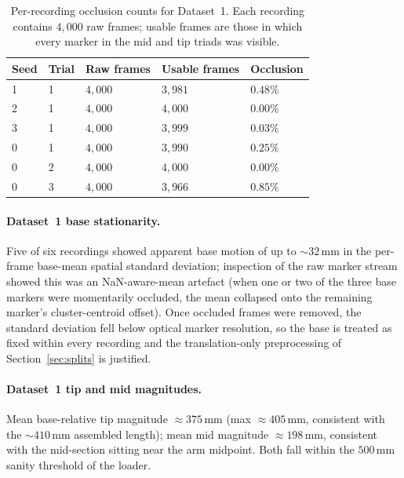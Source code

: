 \begin{table}[!htbp]
  \centering
  \small
  \caption[Per-recording occlusion counts for Dataset~1.]{Per-recording occlusion counts for Dataset~1. Each recording contains $4{,}000$ raw frames; usable frames are those in which every marker in the mid and tip triads was visible.}
  \label{tab:app_eda_ds1_occlusion}
  \begin{tabularx}{\linewidth}{@{}l l X X X@{}}
    \toprule
    Seed & Trial & Raw frames & Usable frames & Occlusion \\
    \midrule
    1 & 1 & $4{,}000$ & $3{,}981$ & $0.48\%$ \\
    2 & 1 & $4{,}000$ & $4{,}000$ & $0.00\%$ \\
    3 & 1 & $4{,}000$ & $3{,}999$ & $0.03\%$ \\
    0 & 1 & $4{,}000$ & $3{,}990$ & $0.25\%$ \\
    0 & 2 & $4{,}000$ & $4{,}000$ & $0.00\%$ \\
    0 & 3 & $4{,}000$ & $3{,}966$ & $0.85\%$ \\
    \bottomrule
  \end{tabularx}
\end{table}

\paragraph{Dataset~1 base stationarity.}
Five of six recordings showed apparent base motion of up to $\sim$$32$\,mm in the per-frame base-mean spatial standard deviation; inspection of the raw marker stream showed this was an NaN-aware-mean artefact (when one or two of the three base markers were momentarily occluded, the mean collapsed onto the remaining marker's cluster-centroid offset). Once occluded frames were removed, the standard deviation fell below optical marker resolution, so the base is treated as fixed within every recording and the translation-only preprocessing of Section~\ref{sec:splits} is justified.

\paragraph{Dataset~1 tip and mid magnitudes.}
Mean base-relative tip magnitude $\approx 375$\,mm (max $\approx 405$\,mm, consistent with the $\sim$$410$\,mm assembled length); mean mid magnitude $\approx 198$\,mm, consistent with the mid-section sitting near the arm midpoint. Both fall within the $500$\,mm sanity threshold of the loader.

